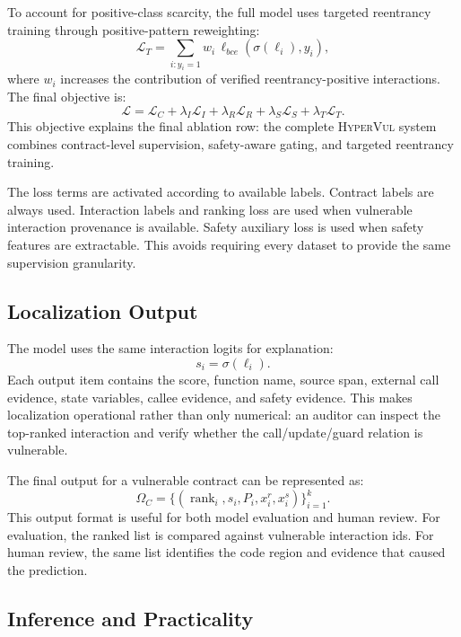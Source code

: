 \documentclass[conference]{IEEEtran}
\newcommand{\tool}{\textsc{HyperVul}}
\begin{document}
To account for positive-class scarcity, the full model uses targeted reentrancy training through positive-pattern reweighting:
\begin{equation}
\mathcal{L}_{T}=\sum_{i:y_i=1} w_i\,\ell_{bce}(\sigma(\ell_i),y_i),
\end{equation}
where $w_i$ increases the contribution of verified reentrancy-positive interactions. The final objective is:
\begin{equation}
\mathcal{L}=\mathcal{L}_{C}+\lambda_I\mathcal{L}_{I}
+\lambda_R\mathcal{L}_{R}+\lambda_S\mathcal{L}_{S}
+\lambda_T\mathcal{L}_{T}.
\end{equation}
This objective explains the final ablation row: the complete \tool{} system combines contract-level supervision, safety-aware gating, and targeted reentrancy training.

The loss terms are activated according to available labels. Contract labels are always used. Interaction labels and ranking loss are used when vulnerable interaction provenance is available. Safety auxiliary loss is used when safety features are extractable. This avoids requiring every dataset to provide the same supervision granularity.

\subsection{Localization Output}

The model uses the same interaction logits for explanation:
\begin{equation}
s_i=\sigma(\ell_i).
\end{equation}
Each output item contains the score, function name, source span, external call evidence, state variables, callee evidence, and safety evidence. This makes localization operational rather than only numerical: an auditor can inspect the top-ranked interaction and verify whether the call/update/guard relation is vulnerable.

The final output for a vulnerable contract can be represented as:
\begin{equation}
\Omega_C=\{(\operatorname{rank}_i,s_i,P_i,x_i^r,x_i^s)\}_{i=1}^{k}.
\end{equation}
This output format is useful for both model evaluation and human review. For evaluation, the ranked list is compared against vulnerable interaction ids. For human review, the same list identifies the code region and evidence that caused the prediction.

\subsection{Inference and Practicality}
\end{document}
